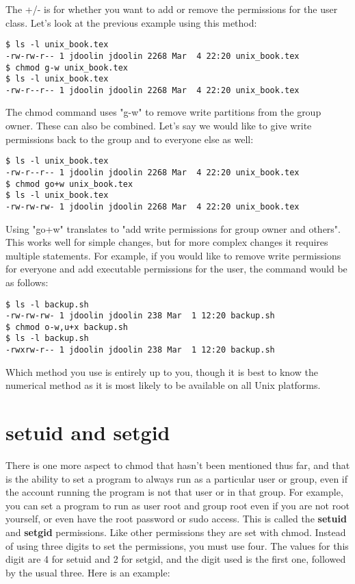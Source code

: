 The +/- is for whether you want to add or remove the permissions for the user class.  Let's look at the previous example using this method:

\begin{verbatim}
$ ls -l unix_book.tex
-rw-rw-r-- 1 jdoolin jdoolin 2268 Mar  4 22:20 unix_book.tex
$ chmod g-w unix_book.tex
$ ls -l unix_book.tex
-rw-r--r-- 1 jdoolin jdoolin 2268 Mar  4 22:20 unix_book.tex
\end{verbatim}

The chmod command uses "g-w" to remove write partitions from the group owner.  These can also be combined.  Let's say we would like to give write permissions back to the group and to everyone else as well:

\begin{verbatim}
$ ls -l unix_book.tex
-rw-r--r-- 1 jdoolin jdoolin 2268 Mar  4 22:20 unix_book.tex
$ chmod go+w unix_book.tex
$ ls -l unix_book.tex
-rw-rw-rw- 1 jdoolin jdoolin 2268 Mar  4 22:20 unix_book.tex
\end{verbatim}

Using "go+w" translates to "add write permissions for group owner and others".  This works well for simple changes, but for more complex changes it requires multiple statements.  For example, if you would like to remove write permissions for everyone and add executable permissions for the user, the command would be as follows:

\begin{verbatim}
$ ls -l backup.sh
-rw-rw-rw- 1 jdoolin jdoolin 238 Mar  1 12:20 backup.sh
$ chmod o-w,u+x backup.sh
$ ls -l backup.sh
-rwxrw-r-- 1 jdoolin jdoolin 238 Mar  1 12:20 backup.sh
\end{verbatim}

Which method you use is entirely up to you, though it is best to know the numerical method as it is most likely to be available on all Unix platforms.

\section{setuid and setgid}

There is one more aspect to chmod that hasn't been mentioned thus far, and that is the ability to set a program to always run as a particular user or group, even if the account running the program is not that user or in that group.  For example, you can set a program to run as user root and group root even if you are not root yourself, or even have the root password or sudo access.  This is called the \textbf{setuid} and \textbf{setgid} permissions.  Like other permissions they are set with chmod.  Instead of using three digits to set the permissions, you must use four.  The values for this digit are 4 for setuid and 2 for setgid, and the digit used is the first one, followed by the usual three.  Here is an example:

